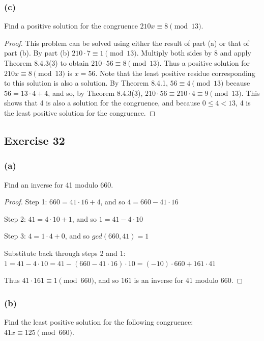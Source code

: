 \documentclass[14pt]{extarticle}
\newcommand{\cy}{\color{cyan}}
\begin{document}
\subsubsection{(c)}
Find a positive solution for the congruence \(210x \equiv 8 \pmod{13}\).

\begin{proof}
        This problem can be solved using either the result of part (a) or that of part (b). By part (b) \(210 \cdot 7 \equiv 1
        \pmod{13}\). Multiply both sides by 8 and apply Theorem 8.4.3(3) to obtain \(210\cdot 56 \equiv 8 \pmod{13}\). Thus
        a positive solution for \(210x \equiv 8 \pmod{13}\) is \(x = 56\). Note that the least positive residue corresponding
        to this solution is also a solution. By Theorem 8.4.1, \(56 \equiv 4 \pmod{13}\) because \(56 = 13 \cdot 4 + 4\), and
        so, by Theorem 8.4.3(3), \(210 \cdot 56 \equiv 210 \cdot 4 \equiv 9 \pmod{13}\). This shows that 4 is also a solution
        for the congruence, and because \(0 \leq 4 < 13\), 4 is the least positive solution for the congruence.
\end{proof}

\subsection{Exercise 32}
\subsubsection{(a)}
Find an inverse for 41 modulo 660.

\begin{proof}
        {\cy Step 1:} \(660 = 41 \cdot 16 + 4\), and so \(4 = 660 - 41 \cdot 16\)

        {\cy Step 2:} \(41 = 4 \cdot 10 + 1\), and so \(1 = 41 - 4 \cdot 10\)

        {\cy Step 3:} \(4 = 1 \cdot 4 + 0\), and so \(gcd(660, 41) = 1\)

        Substitute back through steps 2 and 1:
        \(1 = 41 - 4 \cdot 10 = 41 - (660 - 41 \cdot 16) \cdot 10 = (-10) \cdot 660 + 161 \cdot 41\)

        Thus \(41 \cdot 161 \equiv 1 \pmod{660}\), and so \(161\) is an inverse for 41 modulo 660.
\end{proof}

\subsubsection{(b)}
Find the least positive solution for the following congruence: \(41x \equiv 125 \pmod{660}\).
\end{document}
